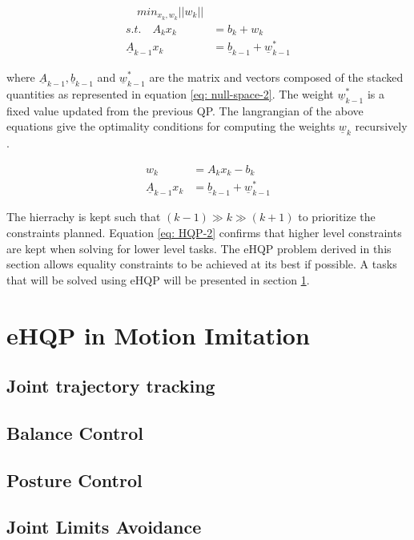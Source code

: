 \begin{align}
    \label{eq: HQP}
    \quad min_{x_k, w_k}||w_k|| \\
    \mathit{s.t.} \quad    A_kx_k &= b_k + w_k \\
    \underline{A}_{k - 1}x_k &= \underline{b}_{k - 1} + \underline{w}_{k - 1}^*
\end{align}

where $\underline{A}_{k - 1}, \underline{b}_{k - 1}$ and $\underline{w}_{k - 1}^*$ are the matrix and vectors composed of the stacked quantities 
as represented in equation \ref{eq: null-space-2}. The weight $\underline{w}_{k - 1}^*$ is a fixed value updated from the previous QP.
The langrangian of the above equations give the optimality conditions for computing the weights $\underline{w}_k$ 
recursively \cite{escande2014hierarchical}.

\begin{align}
    \label{eq: HQP-2}
    w_k &= A_kx_k - b_k \\
    \underline{A}_{k - 1}x_k &= \underline{b}_{k - 1} + \underline{w}_{k - 1}^ *
\end{align}

The hierrachy is kept such that $(k -1) \gg k \gg (k + 1)$ to prioritize the constraints planned. Equation \ref{eq: HQP-2} confirms that 
higher level constraints are kept when solving for lower level tasks. The eHQP problem derived in this section allows equality constraints to
 be achieved at its best if possible.  A tasks that will be solved using eHQP will be presented in section \ref{sec: HQP-imitation}.


\section{eHQP in Motion Imitation}
\label{sec: HQP-imitation}

\subsection{Joint trajectory tracking}
\subsection{Balance Control}
\subsection{Posture Control}
\subsection{Joint Limits Avoidance}